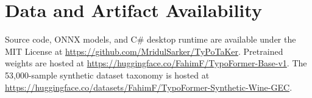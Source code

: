 \documentclass[10pt,journal,compsoc]{IEEEtran}
\begin{document}
\section*{Data and Artifact Availability}
Source code, ONNX models, and C\# desktop runtime are available under the MIT License at \url{https://github.com/MridulSarker/TyPoTaKer}. Pretrained weights are hosted at \url{https://huggingface.co/FahimF/TypoFormer-Base-v1}. The 53,000-sample synthetic dataset taxonomy is hosted at \url{https://huggingface.co/datasets/FahimF/TypoFormer-Synthetic-Wine-GEC}.

\newpage
{}


\end{document}
